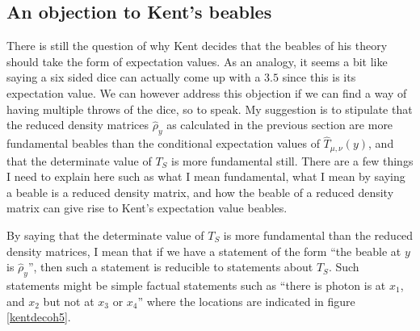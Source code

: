 \subsection{An objection to Kent's beables}


There is still the question of why Kent decides that the beables of his theory should take the form of expectation values. As an analogy, it seems a bit like saying a six sided dice can actually come up with a $3.5$ since this is its expectation value. We can however address this objection if we can find a way of having multiple throws of the dice, so to speak. My suggestion is to stipulate that the reduced density matrices $\hat{\rho}_y$ as calculated in the previous section are more fundamental beables than the conditional expectation values of $\hat{T}_{\mu,\nu}(y)$, and that the determinate value of $T_S$ is more fundamental still. There are a few things I need to explain here such as what I mean fundamental, what I mean by saying a beable is a reduced density matrix, and how the beable of a reduced density matrix can give rise to Kent's expectation value beables.

By saying that the determinate value of $T_S$ is more fundamental than the reduced density matrices,  I mean that if we have a statement of the form ``the beable at $y$ is $\hat{\rho}_y$'', then such a statement is reducible to statements about $T_S$. Such statements might be simple factual statements such as ``there is photon is at $x_1$, and $x_2$ but not at $x_3$ or $x_4$'' where the locations are indicated in figure \ref{kentdecoh5}.

